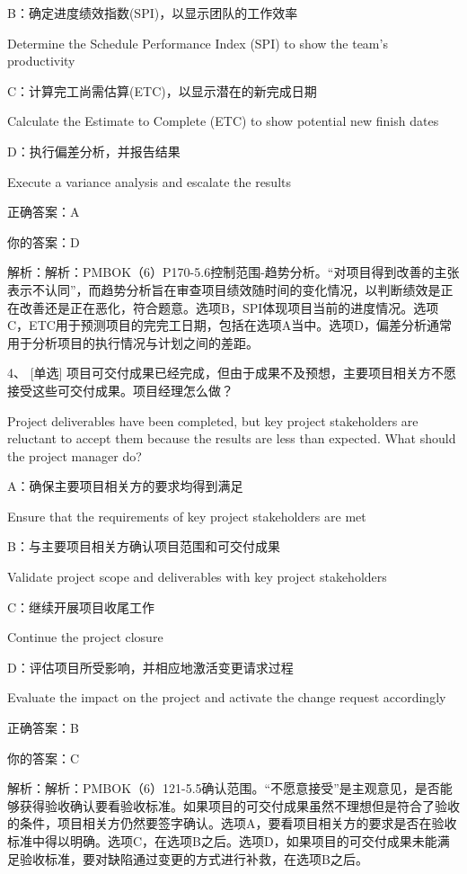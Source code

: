 B：确定进度绩效指数(SPI)，以显示团队的工作效率

Determine the Schedule Performance Index (SPI) to show the team's productivity

C：计算完工尚需估算(ETC)，以显示潜在的新完成日期

Calculate the Estimate to Complete (ETC) to show potential new finish dates

D：执行偏差分析，并报告结果

Execute a variance analysis and escalate the results

正确答案：A

你的答案：D

解析：解析：PMBOK（6）P170-5.6控制范围-趋势分析。“对项目得到改善的主张表示不认同”，而趋势分析旨在审查项目绩效随时间的变化情况，以判断绩效是正在改善还是正在恶化，符合题意。选项B，SPI体现项目当前的进度情况。选项C，ETC用于预测项目的完完工日期，包括在选项A当中。选项D，偏差分析通常用于分析项目的执行情况与计划之间的差距。



4、 [单选] 项目可交付成果已经完成，但由于成果不及预想，主要项目相关方不愿接受这些可交付成果。项目经理怎么做？

Project deliverables have been completed, but key project stakeholders are reluctant to accept them because the results are less than expected. What should the project manager do?

A：确保主要项目相关方的要求均得到满足

Ensure that the requirements of key project stakeholders are met

B：与主要项目相关方确认项目范围和可交付成果

Validate project scope and deliverables with key project stakeholders

C：继续开展项目收尾工作

Continue the project closure

D：评估项目所受影响，并相应地激活变更请求过程

Evaluate the impact on the project and activate the change request accordingly

正确答案：B

你的答案：C

解析：解析：PMBOK（6）121-5.5确认范围。“不愿意接受”是主观意见，是否能够获得验收确认要看验收标准。如果项目的可交付成果虽然不理想但是符合了验收的条件，项目相关方仍然要签字确认。选项A，要看项目相关方的要求是否在验收标准中得以明确。选项C，在选项B之后。选项D，如果项目的可交付成果未能满足验收标准，要对缺陷通过变更的方式进行补救，在选项B之后。



